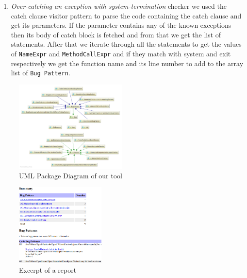 \documentclass[sigconf]{acmart}
\begin{document}
\begin{enumerate}
    \item \textit{Over-catching an exception with system-termination} checker we used the catch clause visitor pattern to parse the code containing the catch clause and get its parameters. If the parameter contains any of the known exceptions then its body of catch block is fetched and from that we get the list of statements. After that we iterate through all the statements to get the values of \texttt{NameExpr} and \texttt{MethodCallExpr} and if they match with system and exit respectively we get the function name and its line number to add to the array list of \texttt {Bug Pattern}.

\end{enumerate}

\begin{figure}
\includegraphics[width=0.5\textwidth]{uml}
\caption{UML Package Diagram of our tool}
\label{uml}
\end{figure}

\begin{figure}
\includegraphics[width=0.4\textwidth]{report}
\caption{Excerpt of a report}
\label{report}
\end{figure}
\end{document}
